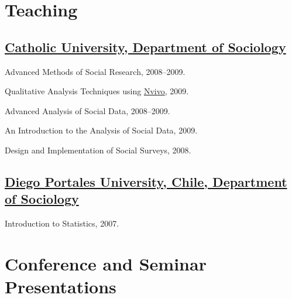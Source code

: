 \documentclass[10pt,letterpaper]{article}
\renewenvironment{itemize}{
  \begin{list}{}{
    \setlength{\leftmargin}{1.5em}
    \setlength{\itemsep}{0.25em}
    \setlength{\parskip}{0pt}
    \setlength{\parsep}{0.25em}
  }
}{
  \end{list}
}
\begin{document}
\section*{Teaching}

\subsection*{\href{http://sociologia.uc.cl/}{Catholic University, Department of Sociology}}

\begin{itemize}
\item Advanced Methods of Social Research, 2008--2009.
\item Qualitative Analysis Techniques using \href{http://www.qsrinternational.com/}{Nvivo}, 2009.
\item Advanced Analysis of Social Data, 2008--2009.
\item An Introduction to the Analysis of Social Data, 2009.
\item Design and Implementation of Social Surveys, 2008.
\end{itemize}

\subsection*{\href{http://www.udp.cl/facultades_carreras/ciencias_sociales-historia/}{Diego Portales University, Chile, Department of Sociology}}

\begin{itemize}
\item Introduction to Statistics, 2007.
\end{itemize}


\section*{Conference and Seminar Presentations}
\end{document}
